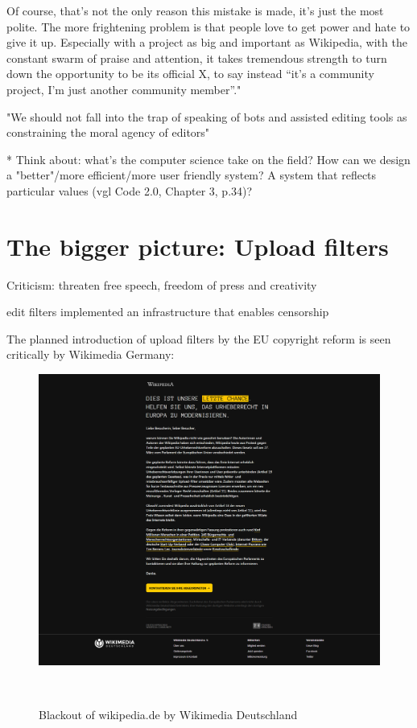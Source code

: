 Of course, that’s not the only reason this mistake is made, it’s just the most polite. The more frightening problem is that people love to get power and hate to give it up. Especially with a project as big and important as Wikipedia, with the constant swarm of praise and attention, it takes tremendous strength to turn down the opportunity to be its official X, to say instead “it’s a community project, I’m just another community member”."

\cite{GeiRib2010}
"We should not fall into the trap of speaking of bots and
assisted editing tools as constraining the moral agency of
editors"

* Think about: what's the computer science take on the field? How can we design a "better"/more efficient/more user friendly system? A system that reflects particular values (vgl Code 2.0, Chapter 3, p.34)?


\section{The bigger picture: Upload filters}

Criticism: threaten free speech, freedom of press and creativity

edit filters implemented an infrastructure that enables censorship

The planned introduction of upload filters by the EU copyright reform is seen critically by Wikimedia Germany:
\begin{figure}
\centering
  \includegraphics[width=0.9\columnwidth]{pics/Blackout_of_wikipediade_by_Wikimedia_Deutschland_-_March_2019.png}
  \caption{Blackout of wikipedia.de by Wikimedia Deutschland}~\label{fig:blackout-upload-filters}
\end{figure}

